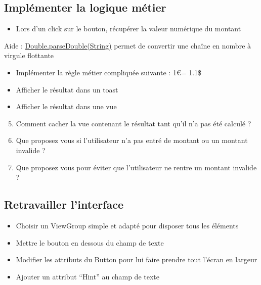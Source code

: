 \documentclass{article}
\begin{document}
\subsection{Implémenter la logique métier}
\begin{itemize}
\item Lors d'un click sur le bouton, récupérer la valeur numérique du montant
\end{itemize}
Aide :
\href{http://developer.android.com/reference/java/lang/Double.html#parseDouble(java.lang.String)}{Double.parseDouble(String)}
permet de convertir une chaîne en nombre à virgule flottante
\begin{itemize}
\item Implémenter la règle métier compliquée suivante : 1\euro  = 1.1\$
\item Afficher le résultat dans un toast
\item Afficher le résultat dans une vue
\end{itemize}
\begin{enumerate}
 \setcounter{enumi}{4}
\item Comment cacher la vue contenant le résultat tant qu'il n'a pas été
calculé ?
\item Que proposez vous si l'utilisateur n'a pas entré de montant ou un montant
invalide ?
\item Que proposez vous pour éviter que l'utilisateur ne rentre un montant
invalide ?
\end{enumerate}
\subsection{Retravailler l'interface}
\begin{itemize}
\item Choisir un ViewGroup simple et adapté pour disposer tous les éléments
\item Mettre le bouton en dessous du champ de texte
\item Modifier les attributs du Button pour lui faire prendre tout l'écran en
largeur
\item Ajouter un attribut ``Hint'' au champ de texte
\end{itemize}
\end{document}
